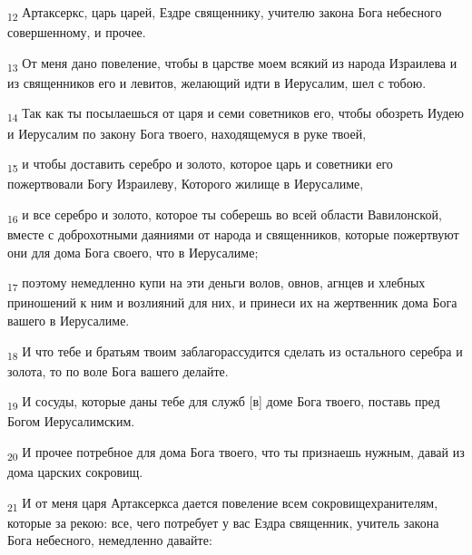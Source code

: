 \begin{tcolorbox}
\textsubscript{12} Артаксеркс, царь царей, Ездре священнику, учителю закона Бога небесного совершенному, и прочее.
\end{tcolorbox}
\begin{tcolorbox}
\textsubscript{13} От меня дано повеление, чтобы в царстве моем всякий из народа Израилева и из священников его и левитов, желающий идти в Иерусалим, шел с тобою.
\end{tcolorbox}
\begin{tcolorbox}
\textsubscript{14} Так как ты посылаешься от царя и семи советников его, чтобы обозреть Иудею и Иерусалим по закону Бога твоего, находящемуся в руке твоей,
\end{tcolorbox}
\begin{tcolorbox}
\textsubscript{15} и чтобы доставить серебро и золото, которое царь и советники его пожертвовали Богу Израилеву, Которого жилище в Иерусалиме,
\end{tcolorbox}
\begin{tcolorbox}
\textsubscript{16} и все серебро и золото, которое ты соберешь во всей области Вавилонской, вместе с доброхотными даяниями от народа и священников, которые пожертвуют они для дома Бога своего, что в Иерусалиме;
\end{tcolorbox}
\begin{tcolorbox}
\textsubscript{17} поэтому немедленно купи на эти деньги волов, овнов, агнцев и хлебных приношений к ним и возлияний для них, и принеси их на жертвенник дома Бога вашего в Иерусалиме.
\end{tcolorbox}
\begin{tcolorbox}
\textsubscript{18} И что тебе и братьям твоим заблагорассудится сделать из остального серебра и золота, то по воле Бога вашего делайте.
\end{tcolorbox}
\begin{tcolorbox}
\textsubscript{19} И сосуды, которые даны тебе для служб [в] доме Бога твоего, поставь пред Богом Иерусалимским.
\end{tcolorbox}
\begin{tcolorbox}
\textsubscript{20} И прочее потребное для дома Бога твоего, что ты признаешь нужным, давай из дома царских сокровищ.
\end{tcolorbox}
\begin{tcolorbox}
\textsubscript{21} И от меня царя Артаксеркса дается повеление всем сокровищехранителям, которые за рекою: все, чего потребует у вас Ездра священник, учитель закона Бога небесного, немедленно давайте:
\end{tcolorbox}
